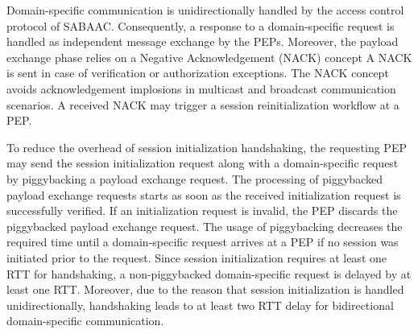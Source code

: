 \begin{description}
    Domain-specific communication is unidirectionally handled by the access control protocol of SABAAC.
    Consequently, a response to a domain-specific request is handled as independent message exchange by the PEPs.
    Moreover, the payload exchange phase relies on a Negative Acknowledgement (NACK) concept
    A NACK is sent in case of verification or authorization exceptions.
    The NACK concept avoids acknowledgement implosions in multicast and broadcast communication scenarios.
    A received NACK may trigger a session reinitialization workflow at a PEP.

    To reduce the overhead of session initialization handshaking, the requesting PEP may send the session initialization request along with a domain-specific request by piggybacking a payload exchange request.
    The processing of piggybacked payload exchange requests starts as soon as the received initialization request is successfully verified.
    If an initialization request is invalid, the PEP discards the piggybacked payload exchange request.
    The usage of piggybacking decreases the required time until a domain-specific request arrives at a PEP if no session was initiated prior to the request.
    Since session initialization requires at least one RTT for handshaking, a non-piggybacked domain-specific request is delayed by at least one RTT.
    Moreover, due to the reason that session initialization is handled unidirectionally, handshaking leads to at least two RTT delay for bidirectional domain-specific communication.


\end{description}
